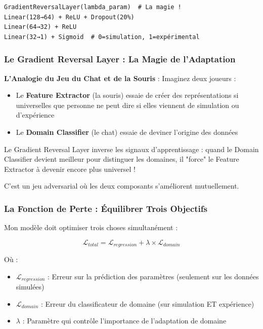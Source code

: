 \documentclass[11pt,a4paper]{article}
\begin{document}
\begin{lstlisting}[caption=Classificateur de domaine avec GRL]
GradientReversalLayer(lambda_param)  # La magie !
Linear(128→64) + ReLU + Dropout(20%)
Linear(64→32) + ReLU
Linear(32→1) + Sigmoid  # 0=simulation, 1=expérimental
\end{lstlisting}

\subsubsection{Le Gradient Reversal Layer : La Magie de l'Adaptation}

\begin{warningbox}
\textbf{L'Analogie du Jeu du Chat et de la Souris} : Imaginez deux joueurs :
\begin{itemize}
    \item Le \textbf{Feature Extractor} (la souris) essaie de créer des représentations si universelles que personne ne peut dire si elles viennent de simulation ou d'expérience
    \item Le \textbf{Domain Classifier} (le chat) essaie de deviner l'origine des données
\end{itemize}

Le Gradient Reversal Layer inverse les signaux d'apprentissage : quand le Domain Classifier devient meilleur pour distinguer les domaines, il "force" le Feature Extractor à devenir encore plus universel !

C'est un jeu adversarial où les deux composants s'améliorent mutuellement.
\end{warningbox}

\subsubsection{La Fonction de Perte : Équilibrer Trois Objectifs}

Mon modèle doit optimiser trois choses simultanément :

\begin{equation}
\mathcal{L}_{total} = \mathcal{L}_{regression} + \lambda \times \mathcal{L}_{domain}
\end{equation}

Où :
\begin{itemize}
    \item $\mathcal{L}_{regression}$ : Erreur sur la prédiction des paramètres (seulement sur les données simulées)
    \item $\mathcal{L}_{domain}$ : Erreur du classificateur de domaine (sur simulation ET expérience)
    \item $\lambda$ : Paramètre qui contrôle l'importance de l'adaptation de domaine
\end{itemize}
\end{document}
